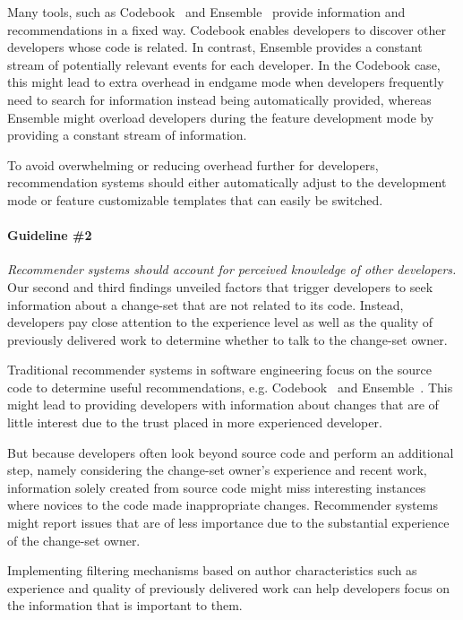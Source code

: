 Many tools, such as Codebook~\cite{begel:icse:2010} and Ensemble~\cite{xiang:rsse:2008} provide information and recommendations in a fixed way. 
Codebook enables developers to discover other developers whose code is related.
In contrast,  Ensemble provides a constant stream of potentially relevant events for each developer.
In the Codebook case, this might lead to extra overhead in endgame mode when developers frequently need to search for information instead being automatically provided, whereas Ensemble might overload developers during the feature development mode by providing a constant stream of information.

To avoid overwhelming or reducing overhead further for developers, recommendation systems should either automatically adjust to the development mode or feature customizable templates that can easily be switched. 

\paragraph{Guideline \#2} \emph{Recommender systems should account for perceived knowledge of other developers.}
Our second and third findings unveiled factors that trigger developers to seek information about a change-set that are not related to its code. 
Instead, developers pay close attention to the experience level as well as the quality of previously delivered work to determine whether to talk to the change-set owner.

Traditional recommender systems in software engineering focus on the source code to determine useful recommendations, e.g. Codebook~\cite{begel:icse:2010} and Ensemble~\cite{xiang:rsse:2008}.
This might lead to providing developers with information about changes that are of little interest due to the trust placed in more experienced developer. 

But because developers often look beyond source code and perform an additional step, namely considering the change-set owner's experience and recent work, information solely created from source code might miss interesting instances where novices to the code made inappropriate changes.
Recommender systems might report issues that are of less importance due to the substantial experience of the change-set owner.

Implementing filtering mechanisms based on author characteristics such as experience and quality of previously delivered work can help developers focus on the information that is important to them.


